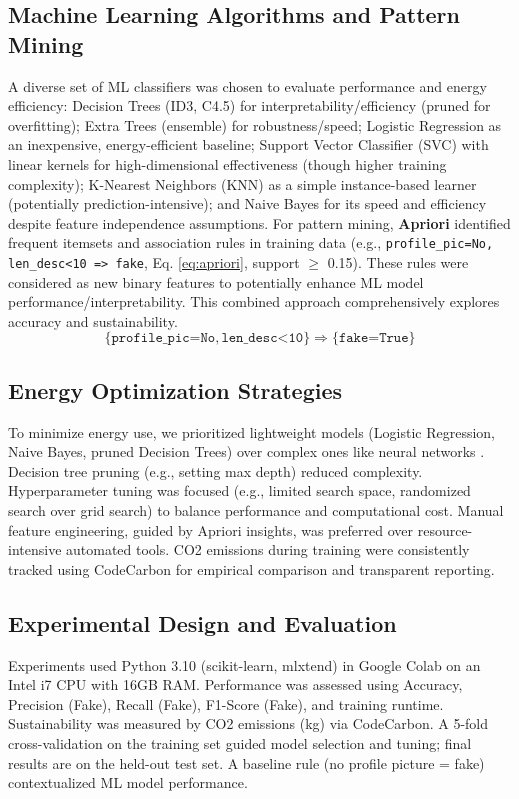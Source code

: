 \documentclass[conference]{IEEEtran}
\begin{document}
\subsection{Machine Learning Algorithms and Pattern Mining}
A diverse set of ML classifiers was chosen to evaluate performance and energy efficiency: Decision Trees (ID3, C4.5) for interpretability/efficiency (pruned for overfitting); Extra Trees (ensemble) for robustness/speed; Logistic Regression as an inexpensive, energy-efficient baseline; Support Vector Classifier (SVC) with linear kernels for high-dimensional effectiveness (though higher training complexity); K-Nearest Neighbors (KNN) as a simple instance-based learner (potentially prediction-intensive); and Naive Bayes for its speed and efficiency despite feature independence assumptions.
For pattern mining, \textbf{Apriori} identified frequent itemsets and association rules in training data (e.g., \texttt{profile\_pic=No, len\_desc<10 => fake}, Eq. \ref{eq:apriori}, support $\ge$ 0.15). These rules were considered as new binary features to potentially enhance ML model performance/interpretability. This combined approach comprehensively explores accuracy and sustainability.
\begin{equation}
\{\texttt{profile\_pic=No}, \texttt{len\_desc<10}\} \Rightarrow \{\texttt{fake=True}\}
\label{eq:apriori}
\end{equation}

\subsection{Energy Optimization Strategies}
To minimize energy use, we prioritized lightweight models (Logistic Regression, Naive Bayes, pruned Decision Trees) over complex ones like neural networks \cite{b6, b4}. Decision tree pruning (e.g., setting max depth) reduced complexity. Hyperparameter tuning was focused (e.g., limited search space, randomized search over grid search) to balance performance and computational cost. Manual feature engineering, guided by Apriori insights, was preferred over resource-intensive automated tools. CO2 emissions during training were consistently tracked using CodeCarbon \cite{b13} for empirical comparison and transparent reporting.

\subsection{Experimental Design and Evaluation}
Experiments used Python 3.10 (scikit-learn, mlxtend) in Google Colab on an Intel i7 CPU with 16GB RAM. Performance was assessed using Accuracy, Precision (Fake), Recall (Fake), F1-Score (Fake), and training runtime. Sustainability was measured by CO2 emissions (kg) via CodeCarbon. A 5-fold cross-validation on the training set guided model selection and tuning; final results are on the held-out test set. A baseline rule (no profile picture = fake) contextualized ML model performance.
\end{document}
